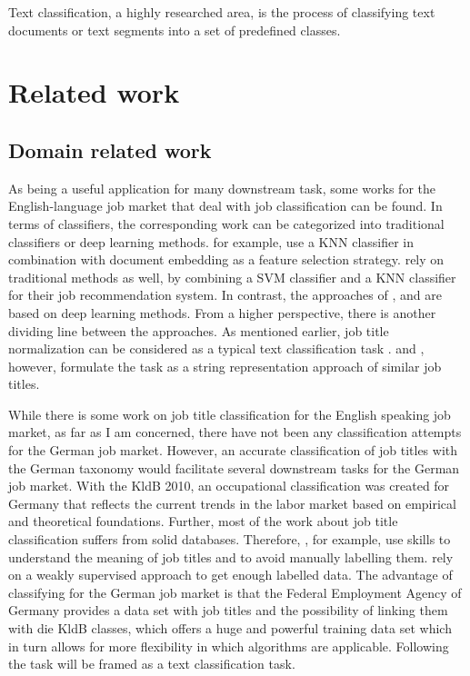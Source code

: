 \documentclass[12pt, a4paper, titlepage]{article}
\begin{document}
Text classification, a highly researched area, is the process of classifying text documents or text segments into a set of predefined classes. 


\section{Related work}
\subsection*{Domain related work}
As being a useful application for many downstream task, some works for the English-language job market that deal with job classification can be found. In terms of classifiers, the corresponding work can be categorized into traditional classifiers or deep learning methods. \cite{zhu2017} for example, use a \ac{KNN} classifier in combination with document embedding as a feature selection strategy. \cite{javed2015} rely on traditional methods as well, by combining a \ac{SVM} classifier and a \ac{KNN} classifier for their job recommendation system. In contrast, the approaches of \cite{decorte2021}, \cite{wang2019} and \cite{neculoiu2016} are based on deep learning methods. From a higher perspective, there is another dividing line between the approaches. As mentioned earlier, job title normalization can be considered as a typical text classification task \citep{wang2019, javed2015, zhu2017}. \cite{decorte2021} and \cite{neculoiu2016}, however, formulate the task as a string representation approach of similar job titles. 

While there is some work on job title classification for the English speaking job market, as far as I am concerned, there have not been any classification attempts for the German job market. However, an accurate classification of job titles with the German taxonomy would facilitate several downstream tasks for the German job market. With the KldB 2010, an occupational classification was created for Germany that reflects the current trends in the labor market based on empirical and theoretical foundations. Further, most of the work about job title classification suffers from solid databases. Therefore, \cite{decorte2021}, for example, use skills to understand the meaning of job titles and to avoid manually labelling them. \cite{javed2015} rely on a weakly supervised approach to get enough labelled data. The advantage of classifying for the German job market is that the Federal Employment Agency of Germany provides a data set with job titles and the possibility of linking them with die KldB classes, which offers a huge and powerful training data set which in turn allows for more flexibility in which algorithms are applicable. Following \citet{wang2019, javed2015, zhu2017} the task will be framed as a text classification task. 
\end{document}
